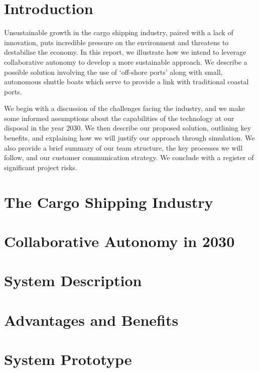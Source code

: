 \documentclass[twoside,a4paper,12pt]{article}
\begin{document}
    \setlength{\parskip}{0.5em}
    
    \newpage
    \tableofcontents
    
	\newpage

	\section{Introduction}
	Unsustainable growth in the cargo shipping industry, paired with a lack of innovation, puts incredible pressure on the environment and threatens to destabilise the economy. In this report, we illustrate how we intend to leverage collaborative autonomy to develop a more sustainable approach. We describe a possible solution involving the use of `off-shore ports' along with small, autonomous shuttle boats  which serve to provide a link with traditional coastal ports. 
	
	We begin with a discussion of the challenges facing the industry, and we make some informed assumptions about the capabilities of the technology at our disposal in the year 2030. We then describe our proposed solution, outlining key benefits, and explaining how we will justify our approach through simulation. We also provide a brief summary of our team structure, the key processes we will follow, and our customer communication strategy. We conclude with a register of significant project risks.
	
	\section{The Cargo Shipping Industry}
	
	\newpage
	\section{Collaborative Autonomy in 2030}
	
	\newpage
	\section{System Description}
	
	\newpage
	\section{Advantages and Benefits}
	
	\newpage
	\section{System Prototype}
	
\end{document}
